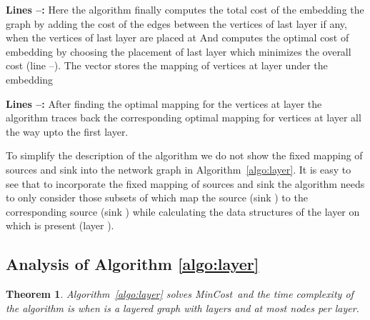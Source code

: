 \documentclass[journal]{IEEEtran}
\newtheorem{theorem}{{\bf Theorem}}
\newcommand{\mincost}{\textsf{MinCost}}
\begin{document}
\textbf{Lines --:} Here the algorithm finally computes the total
  cost of the embedding the graph  by adding the cost of
  the edges between the vertices of last layer  if any, when the
  vertices of last layer are placed at  And computes the optimal
  cost of embedding   by choosing the
  placement of last layer which minimizes the overall cost (line
  --). The vector  stores the mapping of vertices at
  layer  under the embedding 
  
\textbf{Lines --:} After finding the optimal mapping for the vertices
  at layer  the algorithm traces back the corresponding optimal
  mapping for vertices at layer  all the way upto the first
  layer.


To simplify the description of the algorithm we do not show the fixed
mapping of sources and sink into the network graph in
Algorithm~\ref{algo:layer}. It is easy to see that to incorporate the
fixed mapping of sources and sink the algorithm needs to only consider
those subsets  of  which map the source 
(sink ) to the corresponding source  (sink ) while
calculating the data structures of the layer on which  is
present (layer ).

\subsection{Analysis of Algorithm \ref{algo:layer}}

\begin{theorem}
  \label{thm:mincost_layer}
  Algorithm~\ref{algo:layer} solves \mincost\ and the time complexity
  of the algorithm is  when  is a layered
  graph with  layers and at most  nodes per layer.
\end{theorem}
\end{document}
